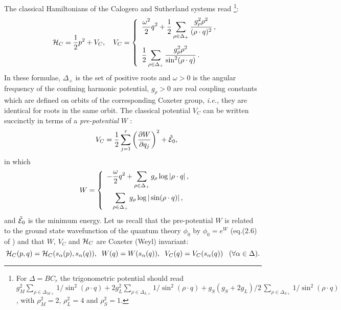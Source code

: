 \documentclass[a4paper,12pt]{article}
\begin{document}
The classical Hamiltonians of the Calogero and Sutherland systems read%
\footnote{For $\Delta=BC_r$ the trigonometric potential should read
$g_{M}^2\sum_{\rho\in\Delta_{M+}}1/\sin^2(\rho\cdot q)
+2g_{L}^2 \sum_{\rho\in\Delta_{L+}}1/\sin^2(\rho\cdot q)
+g_{S}(g_S+2g_L)/2\,\sum_{\rho\in\Delta_{S+}}1/ \sin^2(\rho\cdot q)$,
with $\rho_M^2=2$, $\rho_L^2=4$ and $\rho_S^2=1$.}:
\begin{eqnarray}
   &&{\cal H}_C={1\over 2} p^{2} +V_C,\quad
   V_C=\left\{
   \begin{array}{l}
   \begin{displaystyle}
     {\omega^2\over2}q^2 + {1\over2}\sum_{\rho\in\Delta_+}
     {g_{\rho}^2 \rho^{2}\over{(\rho\cdot q)^2}}\,,
   \end{displaystyle}\\[20pt]
   \begin{displaystyle}
   {1\over2}\sum_{\rho\in\Delta_+}
   {g_{\rho}^2 \rho^{2}\over{\sin^2(\rho\cdot q)}}\,.
   \end{displaystyle}
   \end{array}\right.
   \label{CHam}
\end{eqnarray}
In these formulae, $\Delta_+$ is the set of positive roots and
$\omega>0$ is the angular frequency of the confining harmonic potential,
\(g_{\rho}>0\) are real coupling constants which are defined on orbits of
the corresponding Coxeter group, {\it i.e.,} they are identical for roots
in the same orbit.
The classical potential $V_C$ can be written succinctly
in terms of a {\em pre-potential\/} $W$ \cite{bms}:
\begin{eqnarray}
   &&V_C={1\over2}\sum_{j=1}^r\left(
   {\partial W\over{\partial q_j}}\right)^2+\tilde{\cal E}_0,
   \label{cpot}
\end{eqnarray}
in which
\begin{eqnarray}
   &&W=\left\{
   \begin{array}{c}
   \begin{displaystyle}
   -{\omega\over2}q^2+\sum_{\rho\in\Delta_+}g_{\rho}\log|\rho\cdot q|\,,
   \end{displaystyle}\\[16pt]
   \begin{displaystyle}
   \sum_{\rho\in\Delta_+}g_{\rho}\log|\sin(\rho\cdot q)|\,,
   \end{displaystyle}
   \end{array}\right.
   \label{Wform}
\end{eqnarray}
and $\tilde{\cal E}_0$ is the minimum energy.
Let us recall that the pre-potential $W$ is related to the
ground state wavefunction of the quantum  theory $\phi_0$ by $\phi_0=e^W$
(eq.(2.6) of \cite{cs})
and that $W$, $V_C$ and ${\cal H}_C$ are Coxeter (Weyl) invariant:
\begin{equation}
   {\cal H}_C(p,q)={\cal H}_C(s_\alpha(p),s_\alpha(q)),\;\;
   W(q)=W(s_\alpha(q)),\;\; V_C(q)=V_C(s_\alpha(q))\;\;\;
   (\forall\alpha\in\Delta).
   \label{wCoxinv}
\end{equation}
\end{document}
